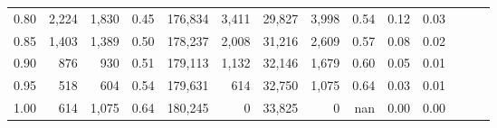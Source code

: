 \begin{tabular}{rrrrrrrrrrrrrr}
0.80 &   2,224 &  1,830 &  0.45 &  176,834 &    3,411 &  29,827 &   3,998 &  0.54 &  0.12 &      0.03 \\
0.85 &   1,403 &  1,389 &  0.50 &  178,237 &    2,008 &  31,216 &   2,609 &  0.57 &  0.08 &      0.02 \\
0.90 &     876 &    930 &  0.51 &  179,113 &    1,132 &  32,146 &   1,679 &  0.60 &  0.05 &      0.01 \\
0.95 &     518 &    604 &  0.54 &  179,631 &      614 &  32,750 &   1,075 &  0.64 &  0.03 &      0.01 \\
1.00 &     614 &  1,075 &  0.64 &  180,245 &        0 &  33,825 &       0 &   nan &  0.00 &      0.00 \\
\bottomrule
\end{tabular}
